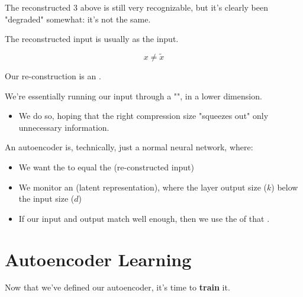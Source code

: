        The reconstructed 3 above is still very recognizable, but it's clearly been "degraded" somewhat: it's not the same.

        \phantom{}

        

        \begin{clarification}
            
            The reconstructed input is usually  as the input.

            \begin{equation*}
                x \neq \tilde{x}
            \end{equation*}

            Our re-construction is an .
        \end{clarification}

        We're essentially running our input through a "", in a lower dimension.

        \begin{itemize}
            \item We do so, hoping that the right compression size "squeezes out" only unnecessary information.\\
        \end{itemize}

        \begin{concept}
            An autoencoder is, technically, just a normal neural network, where:

            \begin{itemize}
                \item We want the  to equal the  (re-constructed input)
                \item We monitor an  (latent representation), where the layer output size ($k$)  below the input size ($d$)
                \item If our input and output match well enough, then we use the  of that .
            \end{itemize}
        \end{concept}


\pagebreak
\section{Autoencoder Learning}

    Now that we've defined our autoencoder, it's time to \textbf{train} it.

